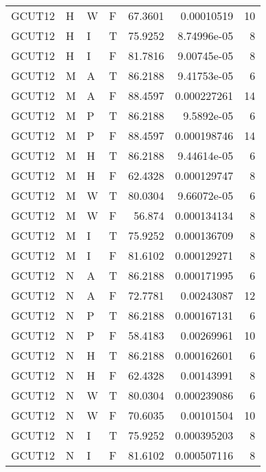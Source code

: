 \begin{table}[!htb]
{\begin{tabular}{llllrrr}
            GCUT12   & H     & W     & F          & 67.3601    & 0.00010519  & 10       \\
            GCUT12   & H     & I     & T          & 75.9252    & 8.74996e-05 & 8        \\
            GCUT12   & H     & I     & F          & 81.7816    & 9.00745e-05 & 8        \\
            GCUT12   & M     & A     & T          & 86.2188    & 9.41753e-05 & 6        \\
            GCUT12   & M     & A     & F          & 88.4597    & 0.000227261 & 14       \\
            GCUT12   & M     & P     & T          & 86.2188    & 9.5892e-05  & 6        \\
            GCUT12   & M     & P     & F          & 88.4597    & 0.000198746 & 14       \\
            GCUT12   & M     & H     & T          & 86.2188    & 9.44614e-05 & 6        \\
            GCUT12   & M     & H     & F          & 62.4328    & 0.000129747 & 8        \\
            GCUT12   & M     & W     & T          & 80.0304    & 9.66072e-05 & 6        \\
            GCUT12   & M     & W     & F          & 56.874     & 0.000134134 & 8        \\
            GCUT12   & M     & I     & T          & 75.9252    & 0.000136709 & 8        \\
            GCUT12   & M     & I     & F          & 81.6102    & 0.000129271 & 8        \\
            GCUT12   & N     & A     & T          & 86.2188    & 0.000171995 & 6        \\
            GCUT12   & N     & A     & F          & 72.7781    & 0.00243087  & 12       \\
            GCUT12   & N     & P     & T          & 86.2188    & 0.000167131 & 6        \\
            GCUT12   & N     & P     & F          & 58.4183    & 0.00269961  & 10       \\
            GCUT12   & N     & H     & T          & 86.2188    & 0.000162601 & 6        \\
            GCUT12   & N     & H     & F          & 62.4328    & 0.00143991  & 8        \\
            GCUT12   & N     & W     & T          & 80.0304    & 0.000239086 & 6        \\
            GCUT12   & N     & W     & F          & 70.6035    & 0.00101504  & 10       \\
            GCUT12   & N     & I     & T          & 75.9252    & 0.000395203 & 8        \\
            GCUT12   & N     & I     & F          & 81.6102    & 0.000507116 & 8        \\
            \hline
        \end{tabular}
    }{}
\end{table}